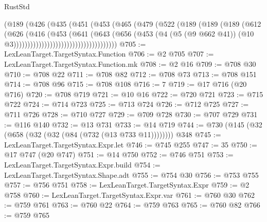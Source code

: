 \begin{lexlean}{RustStd}
\begin{coremodule}
                                    (@189
                                      (@426
                                        (@435
                                          (@451
                                            (@453
                                              (@465
                                                (@479
                                                  (@522
                                                    (@189
                                                      (@189
                                                        (@189
                                                          (@612
                                                            (@626
                                                              (@416
                                                                (@453
                                                                  (@641
                                                                    (@643
                                                                      (@656
                                                                        (@453
                                                                          (@4
                                                                            (@5 (@9 @662 @41))
                                                                            (@10
                                                                              @3)))))))))))))))))))))))))))))))))))))
@705 := LexLeanTarget.TargetSyntax.Function
@706 := @2 @705
@707 := LexLeanTarget.TargetSyntax.Function.mk
@708 := @2 @16
@709 := @708 @30
@710 := @708 @22
@711 := @708 @82
@712 := @708 @73
@713 := @708 @151
@714 := @708 @96
@715 := @708 @108
@716 := 7
@719 := @17 @716 (@20 @716)
@720 := @708 @719
@721 := @10 @16
@722 := @720 @721
@723 := @715 @722
@724 := @714 @723
@725 := @713 @724
@726 := @712 @725
@727 := @711 @726
@728 := @710 @727
@729 := @709 @728
@730 := @707 @729
@731 := @116 @140
@732 := @13 @731
@733 := @14 @719
@744 := @730 (@145 (@32 (@658 (@32 (@32 (@84 (@732 (@13 @733 @11)))))))) @348
@745 := LexLeanTarget.TargetSyntax.Expr.let
@746 := @745 @255
@747 := 35
@750 := @17 @747 (@20 @747)
@751 := @14 @750
@752 := @746 @751
@753 := LexLeanTarget.TargetSyntax.Expr.build
@754 := LexLeanTarget.TargetSyntax.Shape.adt
@755 := @754 @30
@756 := @753 @755
@757 := @756 @751
@758 := LexLeanTarget.TargetSyntax.Expr
@759 := @2 @758
@760 := LexLeanTarget.TargetSyntax.Expr.var
@761 := @760 @30
@762 := @759 @761
@763 := @760 @22
@764 := @759 @763
@765 := @760 @82
@766 := @759 @765

\end{coremodule}
\end{lexlean}
